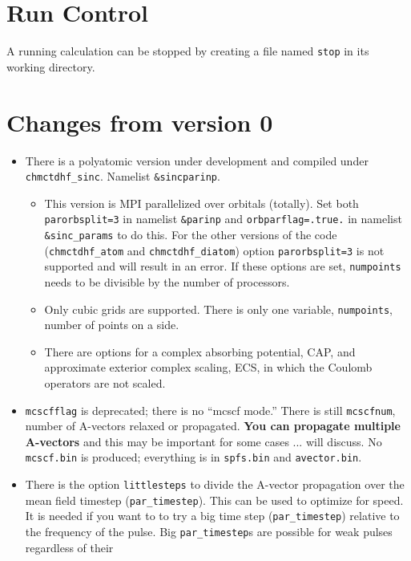 \documentclass[10pt,leqno, oneside]{book}
\begin{document}
\section{Run Control}
A running calculation can be stopped by creating a file named \verb#stop# in its working directory.  

\section{Changes from version 0}

\begin{itemize}
%
\item{There is a polyatomic version under development and compiled under \verb#chmctdhf_sinc#.  Namelist \verb#&sincparinp#.
\begin{itemize}
\item{This version is MPI parallelized over orbitals (totally).  Set both \verb#parorbsplit=3# in namelist \verb#&parinp# and \verb#orbparflag=.true.# in 
namelist \verb#&sinc_params# to do this.  
For the other versions of the code (\verb#chmctdhf_atom# and \verb#chmctdhf_diatom#) option \verb#parorbsplit=3# is not
supported and will result in an error.  If these options are set, \verb#numpoints# needs to be divisible by the number of processors.}
%
\item{Only cubic grids are supported.  There is only one variable, \verb#numpoints#, number of points on a side.}
\item{There are options for a complex absorbing potential, CAP, and approximate exterior complex scaling, 
ECS, in which the Coulomb operators are not scaled.}
\end{itemize}
}
%
\item{\verb#mcscfflag# is deprecated; there is no ``mcscf mode.''  There is still \verb#mcscfnum#, number of A-vectors relaxed or propagated.  
\textbf{You can propagate multiple A-vectors} and this may be important for some cases ... will discuss.
No \verb#mcscf.bin# is produced; everything is in \verb#spfs.bin# and \verb#avector.bin#.}
%
\item{There is the option \verb#littlesteps# to divide the A-vector propagation over the mean field timestep (\verb#par_timestep#).  This can be used
to optimize for speed.  It is needed if you want to
to try a big time step (\verb#par_timestep#) relative to the frequency of the pulse.  Big \verb#par_timestep#s are possible for weak pulses regardless of their
}
\end{itemize}
\end{document}
